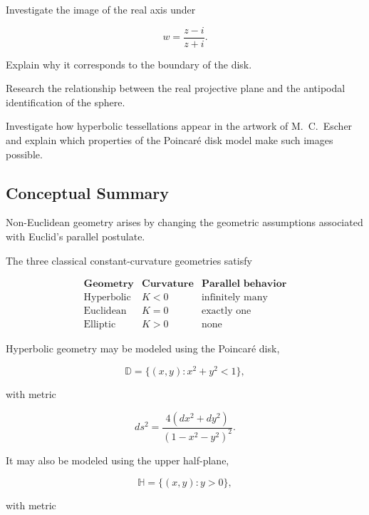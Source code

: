 \begin{exercise}[4]
Investigate the image of the real axis under

\[
w=\frac{z-i}{z+i}.
\]

Explain why it corresponds to the boundary of the disk.
\end{exercise}

\begin{exercise}[4]
Research the relationship between the real projective plane and the
antipodal identification of the sphere.
\end{exercise}

\begin{exercise}[4]
Investigate how hyperbolic tessellations appear in the artwork of
M.~C.~Escher and explain which properties of the Poincar\'e disk model make
such images possible.
\end{exercise}

\subsection{Conceptual Summary}
\label{subsec:non-euclidean-summary}

Non-Euclidean geometry arises by changing the geometric assumptions
associated with Euclid's parallel postulate.

The three classical constant-curvature geometries satisfy

\[
\boxed{
\begin{array}{c|c|c}
\textbf{Geometry} &
\textbf{Curvature} &
\textbf{Parallel behavior}\\
\hline
\text{Hyperbolic} & K<0 & \text{infinitely many}\\
\text{Euclidean} & K=0 & \text{exactly one}\\
\text{Elliptic} & K>0 & \text{none}
\end{array}
}
\]

Hyperbolic geometry may be modeled using the Poincar\'e disk,

\[
\mathbb{D}
=
\{(x,y):x^2+y^2<1\},
\]

with metric

\[
\boxed{
ds^2
=
\frac{4(dx^2+dy^2)}
{(1-x^2-y^2)^2}.
}
\]

It may also be modeled using the upper half-plane,

\[
\mathbb{H}
=
\{(x,y):y>0\},
\]

with metric

